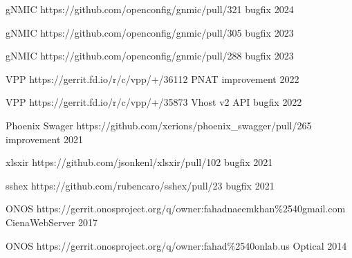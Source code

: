 

\begin{cvhonors}


  \cvhonor
    {gNMIC} %
    {https://github.com/openconfig/gnmic/pull/321}
    {bugfix} %
    {2024} %

  \cvhonor
    {gNMIC} %
    {https://github.com/openconfig/gnmic/pull/305}
    {bugfix} %
    {2023} %

  \cvhonor
    {gNMIC} %
    {https://github.com/openconfig/gnmic/pull/288}
    {bugfix} %
    {2023} %

  \cvhonor
    {VPP} %
    {https://gerrit.fd.io/r/c/vpp/+/36112}
    {PNAT improvement} %
    {2022} %

  \cvhonor
    {VPP} %
    {https://gerrit.fd.io/r/c/vpp/+/35873}
    {Vhost v2 API bugfix} %
    {2022} %

  \cvhonor
    {Phoenix Swager} %
    {https://github.com/xerions/phoenix\_swagger/pull/265}
    {improvement} %
    {2021} %

  \cvhonor
    {xlsxir} %
    {https://github.com/jsonkenl/xlsxir/pull/102}
    {bugfix} %
    {2021} %

  \cvhonor
    {sshex} %
    {https://github.com/rubencaro/sshex/pull/23}
    {bugfix} %
    {2021} %

  \cvhonor
    {ONOS} %
    {https://gerrit.onosproject.org/q/owner:fahadnaeemkhan\%2540gmail.com}
    {CienaWebServer} %
    {2017} %

  \cvhonor
    {ONOS} %
    {https://gerrit.onosproject.org/q/owner:fahad\%2540onlab.us}
    {Optical} %
    {2014} %

\end{cvhonors}
